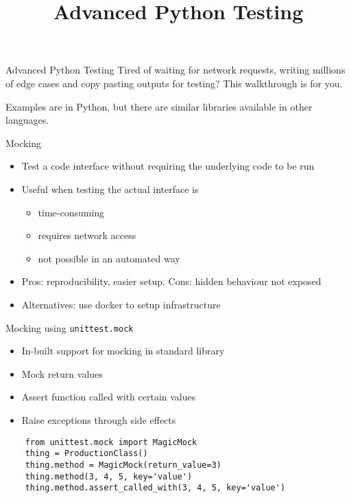 \documentclass[11pt,xcolor={dvipsnames},hyperref={pdftex,pdfpagemode=UseNone,hidelinks,pdfdisplaydoctitle=true},usepdftitle=false]{beamer}
\begin{document}
\title{Advanced Python Testing}

\frame{\titlepage}

\begin{frame}{Advanced Python Testing}
\label{advanced-python-testing}
Tired of waiting for network requests, writing millions of edge cases
and copy pasting outputs for testing? This walkthrough is for you.

Examples are in Python, but there are similar libraries available in
other languages.

\end{frame}

\begin{frame}{Mocking}
\label{mocking}
\begin{itemize}
\item
  Test a code interface without requiring the underlying code to be run
\item
  Useful when testing the actual interface is

  \begin{itemize}
  \item
    time-consuming
  \item
    requires network access
  \item
    not possible in an automated way
  \end{itemize}
\item Pros: reproducibility, easier setup. Cons: hidden behaviour not exposed
\item Alternatives: use docker to setup infrastructure
\end{itemize}
\end{frame}


\begin{frame}[fragile]{Mocking using \texttt{unittest.mock}}
\begin{itemize}
  \item In-built support for mocking in standard library
  \item Mock return values
  \item Assert function called with certain values
  \item Raise exceptions through side effects
\end{itemize}
\begin{verbatim}
    from unittest.mock import MagicMock
    thing = ProductionClass()
    thing.method = MagicMock(return_value=3)
    thing.method(3, 4, 5, key='value')
    thing.method.assert_called_with(3, 4, 5, key='value')
\end{verbatim}
\end{frame}
\end{document}
